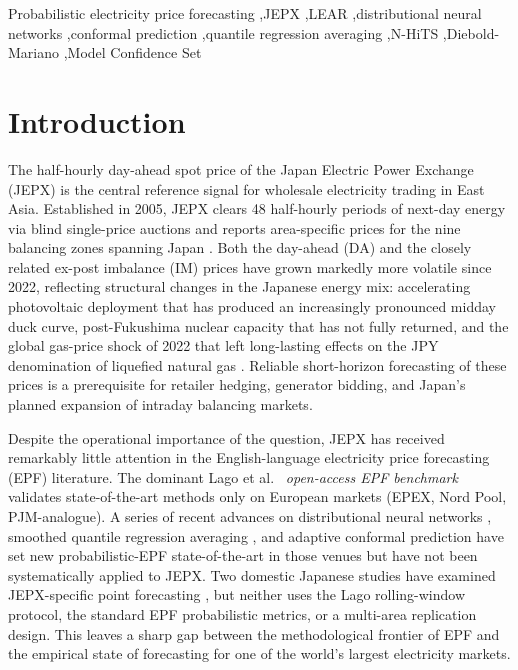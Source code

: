 \documentclass[review,3p,times,authoryear]{elsarticle}
\begin{document}
\begin{frontmatter}
\begin{abstract}
matters. We release the JEPX-EPF benchmark dataset, all code, and per-issuance prediction matrices for ten forecasters (\(\sim\)14{,}640 issuance times \(\times\) 48 horizons per (area, market)) under an open licence to enable reproducible follow-on work in the otherwise data-sparse Asian EPF literature.
\end{abstract}

\begin{keyword}
Probabilistic electricity price forecasting \sep JEPX \sep LEAR \sep distributional neural networks \sep conformal prediction \sep quantile regression averaging \sep N-HiTS \sep Diebold-Mariano \sep Model Confidence Set
\end{keyword}
\end{frontmatter}

\section{Introduction}\label{sec:intro}
The half-hourly day-ahead spot price of the Japan Electric Power Exchange (JEPX) is the central reference signal for wholesale electricity trading in East Asia. Established in 2005, JEPX clears 48 half-hourly periods of next-day energy via blind single-price auctions and reports area-specific prices for the nine balancing zones spanning Japan \citep{ito2016}. Both the day-ahead (DA) and the closely related ex-post imbalance (IM) prices have grown markedly more volatile since 2022, reflecting structural changes in the Japanese energy mix: accelerating photovoltaic deployment that has produced an increasingly pronounced midday duck curve, post-Fukushima nuclear capacity that has not fully returned, and the global gas-price shock of 2022 that left long-lasting effects on the JPY denomination of liquefied natural gas \citep{meti2021,hirth2015}. Reliable short-horizon forecasting of these prices is a prerequisite for retailer hedging, generator bidding, and Japan's planned expansion of intraday balancing markets.

Despite the operational importance of the question, JEPX has received remarkably little attention in the English-language electricity price forecasting (EPF) literature. The dominant Lago et al.\ \citep{lago2021} \emph{open-access EPF benchmark} validates state-of-the-art methods only on European markets (EPEX, Nord Pool, PJM-analogue). A series of recent advances on distributional neural networks \citep{marcjasz2023}, smoothed quantile regression averaging \citep{uniejewski2021}, and adaptive conformal prediction have set new probabilistic-EPF state-of-the-art in those venues but have not been systematically applied to JEPX. Two domestic Japanese studies have examined JEPX-specific point forecasting \citep{hirota2024,matsumoto_jepx_2025}, but neither uses the Lago rolling-window protocol, the standard EPF probabilistic metrics, or a multi-area replication design. This leaves a sharp gap between the methodological frontier of EPF and the empirical state of forecasting for one of the world's largest electricity markets.
\end{document}
